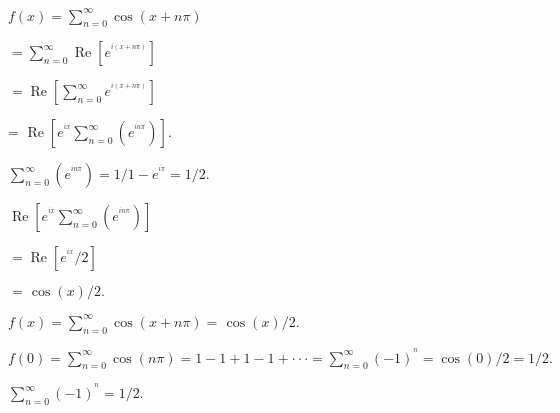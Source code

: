 \documentclass{article}
\newcommand{\tmop}[1]{\ensuremath{\operatorname{#1}}}
\begin{document}
\begin{center}
  $f (x) = \sum^{\infty}_{n = 0} \cos (x + n \pi)$

\end{center}

\begin{center}
  $= \sum^{\infty}_{n = 0} \tmop{Re} [e^{^{i (x + n \pi)}}]$

\end{center}

\begin{center}
 $= \tmop{Re} \left[ \sum^{\infty}_{n = 0} e^{^{i (x + n \pi)}} \right]$

\end{center}

\begin{center}
 = $\tmop{Re} \left[ e^{^{ix}} \sum^{\infty}_{n = 0} (e^{^{in \pi}})
  \right]$.

\end{center}

\begin{center}
$\sum^{\infty}_{n = 0} (e^{^{in \pi}}) = 1 / 1 - e^{^{i \pi}} = 1 / 2.$

\end{center}

\begin{center}
  $\tmop{Re} \left[ e^{^{ix}} \sum^{\infty}_{n = 0} (e^{^{in \pi}}) \right]$

\end{center}
  
\begin{center}
  $= \tmop{Re} [e^{^{ix}} / 2]$

\end{center}

\begin{center}  
  $=^{^{}} \cos (x) / 2.$

\end{center}

\begin{center}
  $f (x) = \sum^{\infty}_{n = 0} \cos (x + n \pi) =^{^{}} \cos (x) / 2.$

\end{center}

\begin{center}
  $f (0) = \sum^{\infty}_{n = 0} \cos (n \pi) = 1 - 1 + 1 - 1 + \cdot \cdot
  \cdot = \sum^{\infty}_{n = 0} (- 1)^{^n} = \cos (0) / 2 = 1 / 2.$

\end{center}

\begin{center}
  $\sum^{\infty}_{n = 0} (- 1)^{^n} = 1 / 2.$

\end{center}
\end{document}
